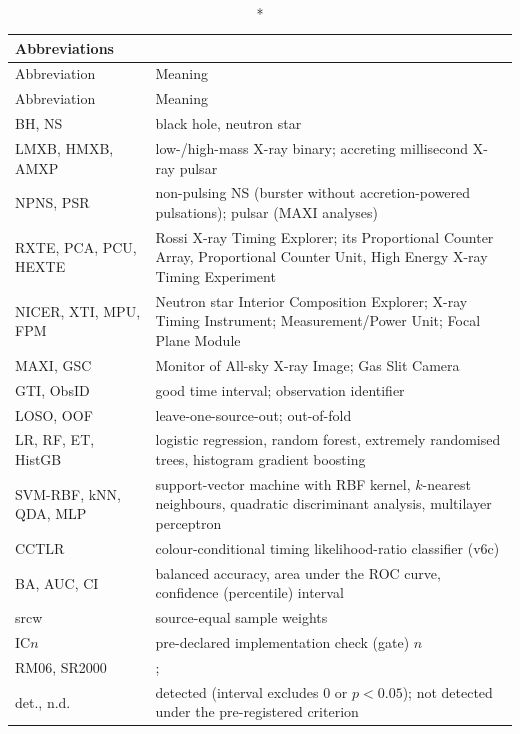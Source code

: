 {\small\setlength{\tabcolsep}{4pt}
\begin{longtable}{@{}p{2.6cm}>{\raggedright\arraybackslash}p{11.2cm}@{}}
\caption*{\textbf{Abbreviations}}\\
\toprule
Abbreviation & Meaning \\
\midrule\endfirsthead
\toprule Abbreviation & Meaning \\ \midrule\endhead
\bottomrule\endfoot
BH, NS & black hole, neutron star \\
LMXB, HMXB, AMXP & low-/high-mass X-ray binary; accreting millisecond X-ray pulsar \\
NPNS, PSR & non-pulsing NS (burster without accretion-powered pulsations); pulsar (MAXI analyses) \\
RXTE, PCA, PCU, HEXTE & Rossi X-ray Timing Explorer; its Proportional Counter Array, Proportional Counter Unit, High Energy X-ray Timing Experiment \\
NICER, XTI, MPU, FPM & Neutron star Interior Composition Explorer; X-ray Timing Instrument; Measurement/Power Unit; Focal Plane Module \\
MAXI, GSC & Monitor of All-sky X-ray Image; Gas Slit Camera \\
GTI, ObsID & good time interval; observation identifier \\
LOSO, OOF & leave-one-source-out; out-of-fold \\
LR, RF, ET, HistGB & logistic regression, random forest, extremely randomised trees, histogram gradient boosting \\
SVM-RBF, kNN, QDA, MLP & support-vector machine with RBF kernel, $k$-nearest neighbours, quadratic discriminant analysis, multilayer perceptron \\
CCTLR & colour-conditional timing likelihood-ratio classifier (v6c) \\
BA, AUC, CI & balanced accuracy, area under the ROC curve, confidence (percentile) interval \\
srcw & source-equal sample weights \\
IC$n$ & pre-declared implementation check (gate) $n$ \\
RM06, SR2000 & \citet{RemillardMcClintock2006}; \citet{SunyaevRevnivtsev2000} \\
det., n.d. & detected (interval excludes 0 or $p<0.05$); not detected under the pre-registered criterion \\
\end{longtable}}
